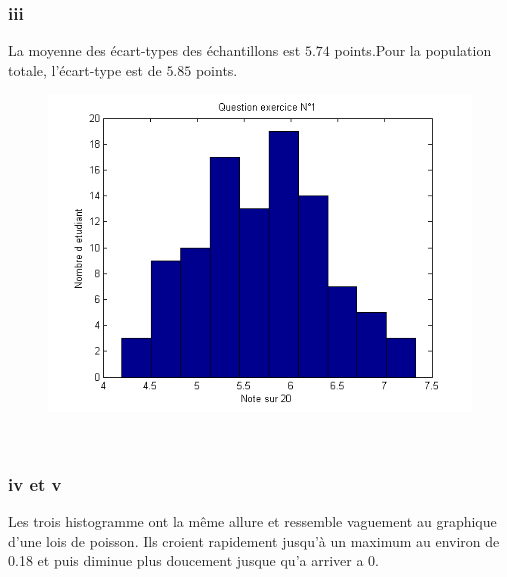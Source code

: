 \documentclass[10pt,a4paper]{article}
\begin{document}
\subsubsection*{iii}

La moyenne des écart-types des échantillons est $5.74$ points.Pour la population totale, l'écart-type est de $5.85$ points. 

\begin{figure}[H]
\centering
\includegraphics[scale= 0.5]{2biii_graphe.png}
\end{figure}
\ \\

\subsubsection*{iv et v}

Les trois histogramme ont la même allure et ressemble vaguement au graphique d'une lois de poisson. Ils croient rapidement jusqu'à un maximum au environ de 0.18 et puis diminue plus doucement jusque qu'a arriver a 0. 
\ \\
\end{document}

